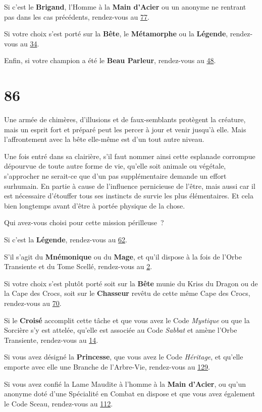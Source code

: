 \documentclass{report}
\newcommand{\gsection}[1]{
    \section{#1}
    \label{section-#1}
}
\newcommand{\glink}[1]{\hyperref[section-#1]{#1}}
\newcommand{\hero}[1]{\textbf{#1}}
\begin{document}
Si c'est le \hero{Brigand}, l'Homme à la \hero{Main d'Acier} ou un anonyme ne rentrant pas dans les cas précédents, rendez-vous au \glink{77}.

Si votre choix s'est porté sur la \hero{Bête}, le \hero{Métamorphe} ou la \hero{Légende}, rendez-vous au \glink{34}.

Enfin, si votre champion a été le \hero{Beau Parleur}, rendez-vous au \glink{48}.

\gsection{86}

Une armée de chimères, d'illusions et de faux-semblants protègent la créature, mais un esprit fort et préparé peut les percer à jour et venir jusqu'à elle. Mais l'affrontement avec la bête elle-même est d'un tout autre niveau.

Une fois entré dans sa clairière, s'il faut nommer ainsi cette esplanade corrompue dépourvue de toute autre forme de vie, qu'elle soit animale ou végétale, s'approcher ne serait-ce que d'un pas supplémentaire demande un effort surhumain. En partie à cause de l'influence pernicieuse de l'être, mais aussi car il est nécessaire d'étouffer tous ses instincts de survie les plus élémentaires. Et cela bien longtemps avant d'être à portée physique de la chose.

Qui avez-vous choisi pour cette mission périlleuse ?

Si c'est la \hero{Légende}, rendez-vous au \glink{62}.

S'il s'agit du \hero{Mnémonique} ou du \hero{Mage}, et qu'il dispose à la fois de l'Orbe Transiente et du Tome Scellé, rendez-vous au \glink{2}.

Si votre choix s'est plutôt porté soit sur la \hero{Bête} munie du Kriss du Dragon ou de la Cape des Crocs, soit sur le \hero{Chasseur} revêtu de cette même Cape des Crocs, rendez-vous au \glink{70}.

Si le \hero{Croisé} accomplit cette tâche et que vous avez le Code \emph{Mystique} ou que la Sorcière s'y est attelée, qu'elle est associée au Code \emph{Sabbat} et amène l'Orbe Transiente, rendez-vous au \glink{14}.

Si vous avez désigné la \hero{Princesse}, que vous avez le Code \emph{Héritage}, et qu'elle emporte avec elle une Branche de l'Arbre-Vie, rendez-vous au \glink{129}.

Si vous avez confié la Lame Maudite à l'homme à la \hero{Main d'Acier}, ou qu'un anonyme doté d'une Spécialité en Combat en dispose et que vous avez également le Code Sceau, rendez-vous au \glink{112}.
\end{document}
